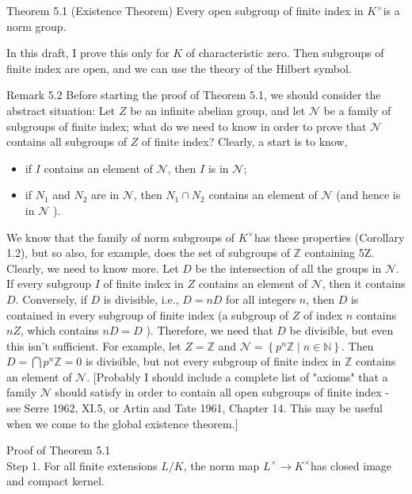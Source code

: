 \documentclass[10pt]{article}
\begin{document}
Theorem 5.1 (Existence Theorem) Every open subgroup of finite index in $K^{\times}$is a norm group.

In this draft, I prove this only for $K$ of characteristic zero. Then subgroups of finite index are open, and we can use the theory of the Hilbert symbol.

Remark 5.2 Before starting the proof of Theorem 5.1, we should consider the abstract situation: Let $Z$ be an infinite abelian group, and let $\mathcal{N}$ be a family of subgroups of finite index; what do we need to know in order to prove that $\mathcal{N}$ contains all subgroups of $Z$ of finite index? Clearly, a start is to know,

\begin{itemize}
  \item[(a)] if $I$ contains an element of $\mathcal{N}$, then $I$ is in $\mathcal{N}$;
  \item[(b)] if $N_{1}$ and $N_{2}$ are in $\mathcal{N}$, then $N_{1} \cap N_{2}$ contains an element of $\mathcal{N}$ (and hence is in $\mathcal{N}$ ).
\end{itemize}

We know that the family of norm subgroups of $K^{\times}$has these properties (Corollary 1.2), but so also, for example, does the set of subgroups of $\mathbb{Z}$ containing 5Z. Clearly, we need to know more. Let $D$ be the intersection of all the groups in $\mathcal{N}$. If every subgroup $I$ of finite index in $Z$ contains an element of $\mathcal{N}$, then it contains $D$. Conversely, if $D$ is divisible, i.e., $D=n D$ for all integers $n$, then $D$ is contained in every subgroup of finite index (a subgroup of $Z$ of index $n$ contains $n Z$, which contains $n D=D$ ). Therefore, we need that $D$ be divisible, but even this isn't sufficient. For example, let $Z=\mathbb{Z}$ and $\mathcal{N}=\left\{p^{n} \mathbb{Z} \mid n \in \mathbb{N}\right\}$. Then $D=\bigcap p^{n} \mathbb{Z}=0$ is divisible, but not every subgroup of finite index in $\mathbb{Z}$ contains an element of $\mathcal{N}$. [Probably I should include a complete list of "axioms" that a family $\mathcal{N}$ should satisfy in order to contain all open subgroups of finite index - see Serre 1962, XI.5, or Artin and Tate 1961, Chapter 14. This may be useful when we come to the global existence theorem.]

Proof of Theorem 5.1\\
Step 1. For all finite extensions $L / K$, the norm map $L^{\times} \rightarrow K^{\times}$has closed image and compact kernel.
\end{document}

